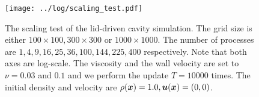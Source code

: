 \begin{figure}[b]
  \centering
  \texttt{[image: ../log/scaling\_test.pdf]}
  \vspace{-3mm}
  \caption{The scaling test of the lid-driven cavity simulation.
  The grid size is either $100 \times 100, 300 \times 300 \text{ or } 1000 \times 1000$.
  The number of processes are $1 ,4 ,9 ,16 ,25 ,36 ,100 ,144 ,225 ,400$ respectively.
  Note that both axes are log-scale.
    The viscosity and the wall velocity are set to $\nu = 0.03$ and $0.1$
    and we perform the update $T = 10000$ times.
    The initial density and velocity are $\rho(\boldsymbol{x}) = 1.0, \boldsymbol{u}(\boldsymbol{x}) = (0, 0)$.
  }
  \label{fig:sliding-lid-scaling}
\end{figure}
